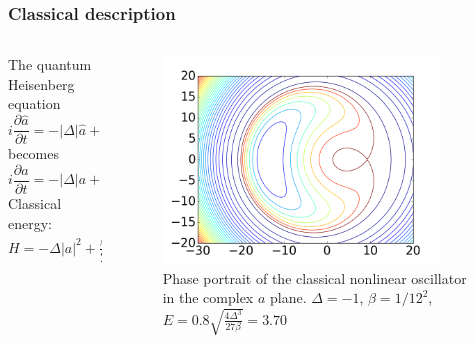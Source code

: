 \documentclass{beamer}
\begin{document}
\begin{frame}
    \frametitle{Classical description}
    \begin{columns}
        \begin{column}{0.5\textwidth}
            The quantum Heisenberg equation 
            \begin{equation*}
                i\frac{\partial\hat{a}}{\partial t} = -|\Delta|\hat{a} + 
                                \beta \hat{a}^\dagger \hat{a} \hat{a} + E
            \end{equation*}
            becomes
            \begin{equation*}
                i\frac{\partial a}{\partial t} = -|\Delta|a + \beta |a|^2 a + E
            \end{equation*}
            Classical energy:
            \begin{equation*}
                H = -\Delta |a|^2 + \frac{\beta}{2}|a|^4 + E^*a + Ea^*
            \end{equation*}
        \end{column}
        \begin{column}{0.5\textwidth}
            \begin{figure}[h]
                \includegraphics[width=0.9\textwidth]{classical_phase_portrait.png}
                \caption{Phase portrait of the classical nonlinear oscillator 
                         in the complex $a$ plane. $\Delta = -1$, $\beta = 1/12^2$, 
                        $E = 0.8 \sqrt{\frac{4\Delta^3}{27\beta}} = 3.70$ }
            \end{figure}
        \end{column}
    \end{columns}
\end{frame}
\end{document}
